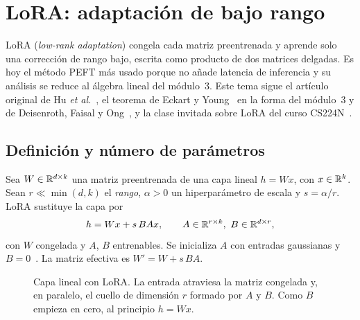\chapter{LoRA: adaptación de bajo rango}
\label{tema:5}

LoRA (\emph{low-rank adaptation}) congela cada matriz preentrenada y aprende solo una corrección de rango bajo, escrita como producto de dos matrices delgadas. Es hoy el método PEFT más usado porque no añade latencia de inferencia y su análisis se reduce al álgebra lineal del módulo~3. Este tema sigue el artículo original de Hu \emph{et al.}~\cite[§4 y~§7]{hu-lora}, el teorema de Eckart y Young~\cite{eckart-young} en la forma del módulo~3 y de Deisenroth, Faisal y Ong~\cite[§4.6]{mml}, y la clase invitada sobre LoRA del curso CS224N~\cite{cs224n}.

\section{Definición y número de parámetros}

\begin{definicion}[LoRA]\label{def:lora}
Sea $W\in\mathbb{R}^{d\times k}$ una matriz preentrenada de una capa lineal $h=Wx$, con $x\in\mathbb{R}^{k}$. Sean $r\ll\min(d,k)$ el \emph{rango}, $\alpha>0$ un hiperparámetro de escala y $s=\alpha/r$. LoRA sustituye la capa por
\[
h=Wx+s\,BAx,\qquad A\in\R^{r\times k},\ B\in\R^{d\times r},
\]
con $W$ congelada y $A$, $B$ entrenables. Se inicializa $A$ con entradas gaussianas y $B=0$~\cite[§4.1]{hu-lora}. La matriz efectiva es $W'=W+s\,BA$.
\end{definicion}

\begin{figure}[h]
\centering
{}
\caption{Capa lineal con LoRA. La entrada atraviesa la matriz congelada y, en paralelo, el cuello de dimensión $r$ formado por $A$ y $B$. Como $B$ empieza en cero, al principio $h=Wx$.}
\label{fig:lora}
\end{figure}

